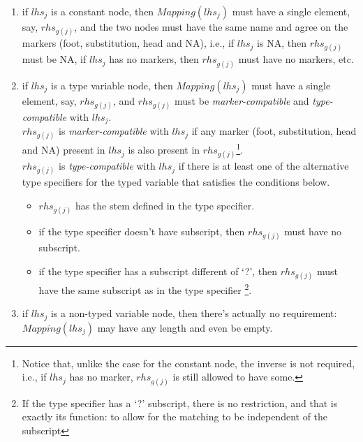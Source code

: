 \begin{enumerate}

\item if $lhs_j$ is a constant node, then $Mapping(lhs_j)$ must have a 
        single element, say, $rhs_{g(j)}$, and the two nodes must have the same
        name and agree on the markers (foot, substitution, head and NA), i.e.,
        if $lhs_j$ is NA, then $rhs_{g(j)}$ must be NA, 
        if $lhs_j$ has no markers, then $rhs_{g(j)}$ must have no markers, etc.

\item if $lhs_j$ is a type variable node, then $Mapping(lhs_j)$ must have a 
        single element, say, $rhs_{g(j)}$, and $rhs_{g(j)}$ must be 
        {\it marker-compatible} and 
        {\it type-compatible} with $lhs_j$. \\
        $rhs_{g(j)}$ is 
        {\it marker-compatible} with $lhs_j$ if any marker
         (foot, substitution, head and NA) present in $lhs_j$ is also
        present in $rhs_{g(j)}$\footnote{Notice that, unlike the case for the
        constant node, the inverse is not required, 
        i.e., if $lhs_j$ has no marker, $rhs_{g(j)}$ is still 
        allowed to have some.}.\\
        $rhs_{g(j)}$ is {\it type-compatible} with $lhs_j$ 
        if there is at least one of the alternative 
        type specifiers for the typed variable that satisfies 
        the conditions below. 

\begin{itemize}
\item   $rhs_{g(j)}$ has the stem defined in the type specifier.
\item   if the type specifier doesn't have subscript, then 
        $rhs_{g(j)}$ must have no subscript.
\item   if the type specifier has a subscript different of `?', then 
        $rhs_{g(j)}$ must have the same subscript as in the type specifier
        \footnote{If the type specifier has a `?' subscript, there is no
        restriction, and that is exactly its function: to allow for the 
        matching to be independent of the subscript}.
\end{itemize}

\item if $lhs_j$ is a non-typed variable node, then there's actually no
        requirement: $Mapping(lhs_j)$ may have any length and even be 
        empty.
\end{enumerate}
        
